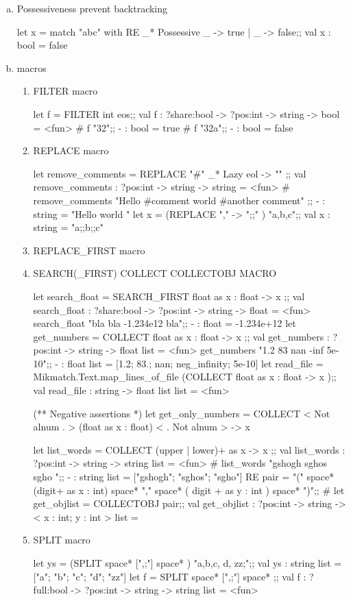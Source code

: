 \begin{enumerate}
\begin{enumerate}[(a)]
\item Possessiveness prevent backtracking 

  \begin{alternate}
let x = match "abc" with RE _* Possessive _ -> true | _ -> false;;
val x : bool = false    
  \end{alternate}

\item macros
  \begin{enumerate}

\item FILTER macro 
  \begin{alternate}
let f = FILTER int eos;;
val f : ?share:bool -> ?pos:int -> string -> bool = <fun>
# f "32";;
- : bool = true
# f "32a";;
- : bool = false    
\end{alternate}

\item REPLACE macro 
  \begin{alternate}
let remove_comments = REPLACE "#" _* Lazy eol -> "" ;;
val remove_comments : ?pos:int -> string -> string = <fun>
# remove_comments "Hello #comment \n world #another comment" ;;
- : string = "Hello \n world "
let x = (REPLACE "," -> ";;" ) "a,b,c";;
val x : string = "a;;b;;c"
\end{alternate}

\item REPLACE\_FIRST macro
\item SEARCH(\_FIRST) COLLECT COLLECTOBJ MACRO

  \begin{alternate}
let search_float = SEARCH_FIRST float as x : float -> x ;;
val search_float : ?share:bool -> ?pos:int -> string -> float = <fun>
search_float "bla bla -1.234e12 bla";;
- : float = -1.234e+12
let get_numbers = COLLECT float as x : float -> x ;;
val get_numbers : ?pos:int -> string -> float list = <fun>
get_numbers "1.2   83  nan  -inf 5e-10";;
- : float list = [1.2; 83.; nan; neg_infinity; 5e-10]
let read_file = Mikmatch.Text.map_lines_of_file (COLLECT float as x : float -> x );;
val read_file : string -> float list list = <fun>

(** Negative assertions *)
let get_only_numbers =  COLLECT < Not alnum . > (float as x : float) < . Not alnum > -> x

let list_words = COLLECT (upper | lower)+ as x -> x ;;
val list_words : ?pos:int -> string -> string list = <fun>
# list_words "gshogh sghos sgho ";;
- : string list = ["gshogh"; "sghos"; "sgho"]
RE pair = "(" space* (digit+ as x : int) space* ","  space* ( digit + as y : int ) space* ")";;
 # let get_objlist = COLLECTOBJ pair;;
val get_objlist : ?pos:int -> string -> < x : int; y : int > list =
  \end{alternate}  
\item SPLIT macro
  \begin{alternate}
let ys = (SPLIT space* [",;"] space* ) "a,b,c, d, zz;";;
val ys : string list = ["a"; "b"; "c"; "d"; "zz"]
let f = SPLIT space* [",;"] space* ;;
val f : ?full:bool -> ?pos:int -> string -> string list = <fun>
\end{alternate}


\end{enumerate}
\end{enumerate}
\end{enumerate}

